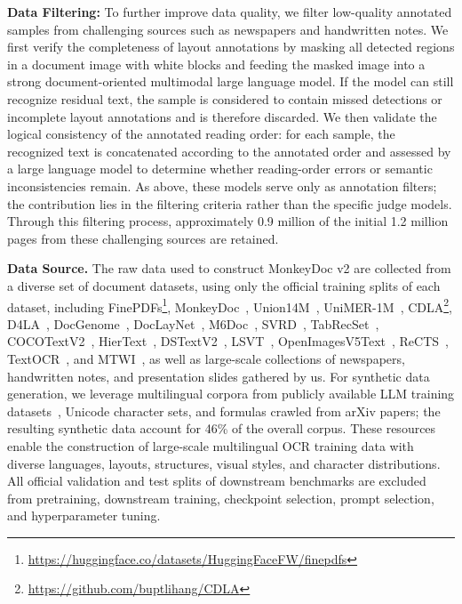 \documentclass{article}
\begin{document}
\textbf{Data Filtering:} To further improve data quality, we filter low-quality annotated samples from challenging sources such as newspapers and handwritten notes. 
We first verify the completeness of layout annotations by masking all detected regions in a document image with white blocks and feeding the masked image into a strong document-oriented multimodal large language model. If the model can still recognize residual text, the sample is considered to contain missed detections or incomplete layout annotations and is therefore discarded. We then validate the logical consistency of the annotated reading order: for each sample, the recognized text is concatenated according to the annotated order and assessed by a large language model to determine whether reading-order errors or semantic inconsistencies remain. 
As above, these models serve only as annotation filters; the contribution lies in the filtering criteria rather than the specific judge models.
Through this filtering process, approximately 0.9 million of the initial 1.2 million pages from these challenging sources are retained.

\textbf{Data Source.} The raw data used to construct MonkeyDoc v2 are collected from a diverse set of document datasets, using only the official training splits of each dataset, including FinePDFs\footnote{\url{https://huggingface.co/datasets/HuggingFaceFW/finepdfs}}, MonkeyDoc~\cite{monkeyocr}, Union14M~\cite{union14m}, UniMER-1M~\cite{unimernet}, CDLA\footnote{\url{https://github.com/buptlihang/CDLA}}, D4LA~\cite{d4la}, DocGenome~\cite{docgenome}, DocLayNet~\cite{doclaynet}, M6Doc~\cite{m6doc}, SVRD~\cite{svrd}, TabRecSet~\cite{TabRecSet}, COCOTextV2~\cite{COCOTextV2}, HierText~\cite{HierText}, DSTextV2~\cite{DSTextV2}, LSVT~\cite{LSVT}, OpenImagesV5Text~\cite{OpenImagesV5Text}, ReCTS~\cite{ReCTS}, TextOCR~\cite{TextOCR}, and MTWI~\cite{MTWI}, as well as large-scale collections of newspapers, handwritten notes, and presentation slides gathered by us. 
For synthetic data generation, we leverage multilingual corpora from publicly available LLM training datasets~\cite{llmyuliao1,llmyuliao2}, Unicode character sets, 
and formulas crawled from arXiv papers; the resulting synthetic data account for 46\% of the overall corpus.
These resources enable the construction of large-scale multilingual OCR training data with diverse languages, layouts, structures, visual styles, and character distributions.
All official validation and test splits of downstream benchmarks are excluded from pretraining, downstream training, checkpoint selection, prompt selection, and hyperparameter tuning.
\end{document}
